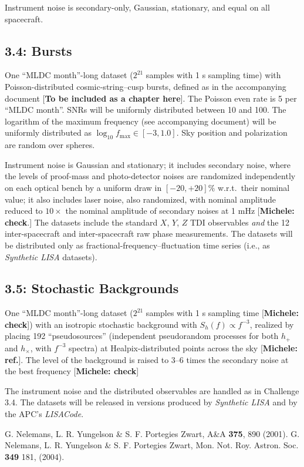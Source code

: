 \documentclass[11pt]{article}
\begin{document}
Instrument noise is secondary-only, Gaussian, stationary, and equal on all spacecraft. 

\subsection*{3.4: Bursts}

One ``MLDC month''-long dataset ($2^{21}$ samples with 1 s sampling time) with Poisson-distributed cosmic-string--cusp bursts, defined as in the accompanying document [\textbf{To be included as a chapter here}]. The Poisson even rate is 5 per ``MLDC month''. SNRs will be uniformly distributed between 10 and 100. The logarithm of the maximum frequency (see accompanying document) will be uniformly distributed as $\log_{10} f_\mathrm{max} \in [-3,1.0]$. Sky position and polarization are random over spheres.

Instrument noise is Gaussian and stationary; it includes secondary noise, where the levels of proof-mass and photo-detector noises are randomized independently on each optical bench by a uniform draw in $[-20,+20]\%$ w.r.t.\ their nominal value; it also includes laser noise, also randomized, with nominal amplitude reduced to $10\times$ the nominal amplitude of secondary noises at 1 mHz [\textbf{Michele: check}.] The datasets include the standard $X$, $Y$, $Z$ TDI observables \emph{and} the 12 inter-spacecraft and inter-spacecraft raw phase measurements. The datasets will be distributed only as fractional-frequency--fluctuation time series (i.e., as \emph{Synthetic LISA} datasets).

\subsection*{3.5: Stochastic Backgrounds}

One ``MLDC month''-long dataset ($2^{21}$ samples with 1 s sampling time [\textbf{Michele: check}]) with an isotropic stochastic background with $S_h(f) \propto f^{-3}$, realized by placing 192 ``pseudosources'' (independent pseudorandom processes for both $h_+$ and $h_\times$, with $f^{-3}$ spectra) at Healpix-distributed points across the sky [\textbf{Michele: ref.}]. The level of the background is raised to 3--6 times the secondary noise at the best frequency [\textbf{Michele: check}]

The instrument noise and the distributed observables are handled as in Challenge 3.4. The datasets will be released in versions produced by \emph{Synthetic LISA} and by the APC's \emph{LISACode}.

\begin{thebibliography}{99}
 G. Nelemans, L. R. Yungelson \& S. F. Portegies Zwart, A\&A {\bf 375}, 890 (2001).
 G. Nelemans, L. R. Yungelson \& S. F. Portegies Zwart, Mon. Not. Roy. Astron. Soc.
{\bf 349} 181, (2004).
\end{thebibliography}
\end{document}
